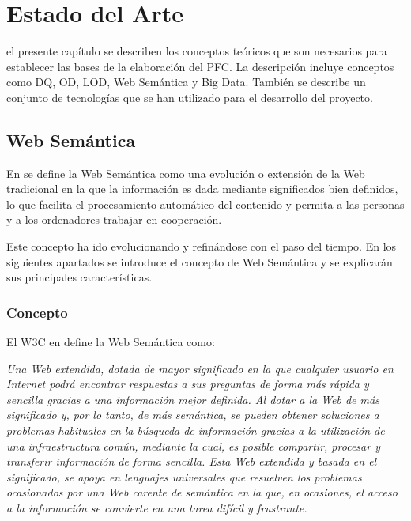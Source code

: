 \chapter{Estado del Arte}
\label{chap:estadoarte}

 el presente capítulo se describen los conceptos teóricos que
son necesarios para establecer las bases de la elaboración del \acs{PFC}. La
descripción incluye conceptos como \acf{DQ}, \acf{OD}, \acf{LOD}, Web
Semántica y Big Data. También se describe un conjunto de tecnologías que se han utilizado
para el desarrollo del proyecto. 




\section{Web Semántica}

En \cite{bernerslee2001semantic} se define la Web Semántica como una evolución o
extensión de la Web tradicional en la que la información es dada mediante
significados bien definidos, lo que facilita el procesamiento automático del
contenido y permita a las personas y a los ordenadores trabajar en cooperación. 

Este concepto ha ido evolucionando y refinándose con el paso del tiempo. En los
siguientes apartados se introduce el concepto de Web Semántica y se explicarán
sus principales características. 

\subsection{Concepto}

El \acf{W3C} en \cite{W3CSWES} define la Web Semántica como: 

\textit{Una Web extendida, dotada de mayor significado en la que cualquier
  usuario en Internet podrá encontrar respuestas a sus preguntas de forma más
  rápida y sencilla gracias a una información mejor definida. Al dotar a la Web
  de más significado y, por lo tanto, de más semántica, se pueden obtener
  soluciones a problemas habituales en la búsqueda de información gracias a la
  utilización de una infraestructura común, mediante la cual, es posible
  compartir, procesar y transferir información de forma sencilla. Esta Web
  extendida y basada en el significado, se apoya en lenguajes universales que
  resuelven los problemas ocasionados por una Web carente de semántica en la
  que, en ocasiones, el acceso a la información se convierte en una tarea
  difícil y frustrante.}

